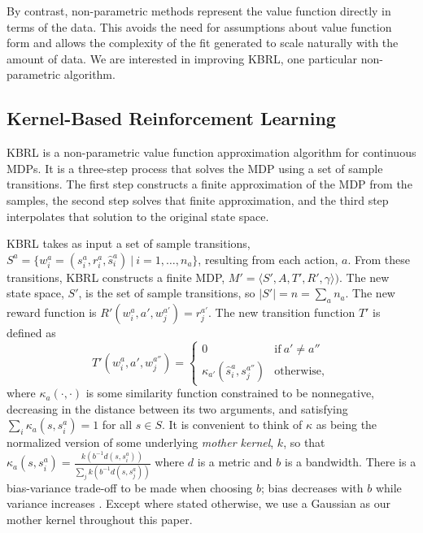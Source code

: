 \documentclass{article} %
\begin{document}
By contrast, non-parametric methods represent the value
function directly in terms of the data.
This avoids the need for assumptions about value function form
and allows the complexity of the fit generated to scale naturally with
the amount of data.
We are interested in improving KBRL, one particular non-parametric algorithm.

\subsection{Kernel-Based Reinforcement Learning}

KBRL \cite{kbrl} is a non-parametric value function approximation algorithm for
continuous MDPs.
It is a three-step process that solves the MDP using a set of sample
transitions.
The first step constructs a finite approximation of the MDP from the samples,
the second step solves that finite approximation, and the third step
interpolates that solution to the original state space.

KBRL takes as input a set of sample transitions, 
$S^a = \{ w^a_i = (s^a_i, r^a_i, \hat s^a_i)\ |\ i = 1, \ldots, n_a \}$, resulting from
each action, $a$. 
From these transitions, KBRL constructs a finite MDP,
$M'=\langle S',A,T',R',\gamma\rangle)$. 
The new state space, $S'$, is the set of sample transitions, so $|S'| = n = \sum_a n_a$. 
The new reward function is $R'(w^a_i, a', w^{a'}_j) = r^{a'}_j$.
The new transition function $T'$ is defined as 
\[
 T'(w^a_i, a', w^{a''}_j) = \left\{
  \begin{array}{lr}
    0 & \mathrm{if}\ a' \neq a'' \\
    \kappa_{a'}(\hat s^a_i, s^{a''}_j) &  \mathrm{otherwise,}
  \end{array}
\right.
\]
where $\kappa_a(\cdot, \cdot)$ is some similarity function constrained
to be nonnegative, decreasing in the distance between its two arguments,
and satisfying $\sum_i \kappa_a(s,s^a_i) = 1$ for all $s \in S$.
It is convenient to think of $\kappa$ as being the normalized
version of some underlying \textit{mother kernel}, $k$, so that
$\kappa_a(s,s^a_i) = \frac{k(b^{-1}d(s,s^a_i))}{\sum_j k(b^{-1}d(s,s^a_j))}$
where $d$ is a metric and $b$ is a bandwidth.
There is a bias-variance trade-off to be made when choosing $b$;
bias decreases with $b$ while variance increases \cite{kbrl}.
Except where stated otherwise, we use a Gaussian as our mother kernel throughout this paper.
\end{document}
